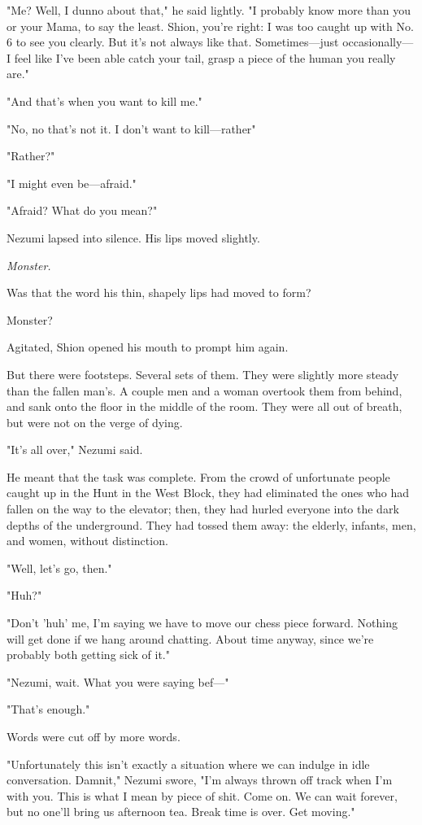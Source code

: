 "Me? Well, I dunno about that," he said lightly. "I probably know more
than you or your Mama, to say the least. Shion, you're right: I was too
caught up with No. 6 to see you clearly. But it's not always like that.
Sometimes---just occasionally---I feel like I've been able catch your tail,
grasp a piece of the human you really are."

"And that's when you want to kill me."

"No, no that's not it. I don't want to kill---rather\el "

"Rather?"

"I might even be---afraid."

"Afraid? What do you mean?"

Nezumi lapsed into silence. His lips moved slightly.

\emph{Monster.}

Was that the word his thin, shapely lips had moved to form?

Monster?

Agitated, Shion opened his mouth to prompt him again.

But there were footsteps. Several sets of them. They were slightly more
steady than the fallen man's. A couple men and a woman overtook them
from behind, and sank onto the floor in the middle of the room. They
were all out of breath, but were not on the verge of dying.

"It's all over," Nezumi said.

He meant that the task was complete. From the crowd of unfortunate
people caught up in the Hunt in the West Block, they had eliminated the
ones who had fallen on the way to the elevator; then, they had hurled
everyone into the dark depths of the underground. They had tossed them
away: the elderly, infants, men, and women, without distinction.

"Well, let's go, then."

"Huh?"

"Don't 'huh' me, I'm saying we have to move our chess piece forward.
Nothing will get done if we hang around chatting. About time anyway,
since we're probably both getting sick of it."

"Nezumi, wait. What you were saying bef---"

"That's enough."

Words were cut off by more words.

"Unfortunately this isn't exactly a situation where we can indulge in
idle conversation. Damnit," Nezumi swore, "I'm always thrown off track
when I'm with you. This is what I mean by piece of shit. Come on. We can
wait forever, but no one'll bring us afternoon tea. Break time is over.
Get moving."

